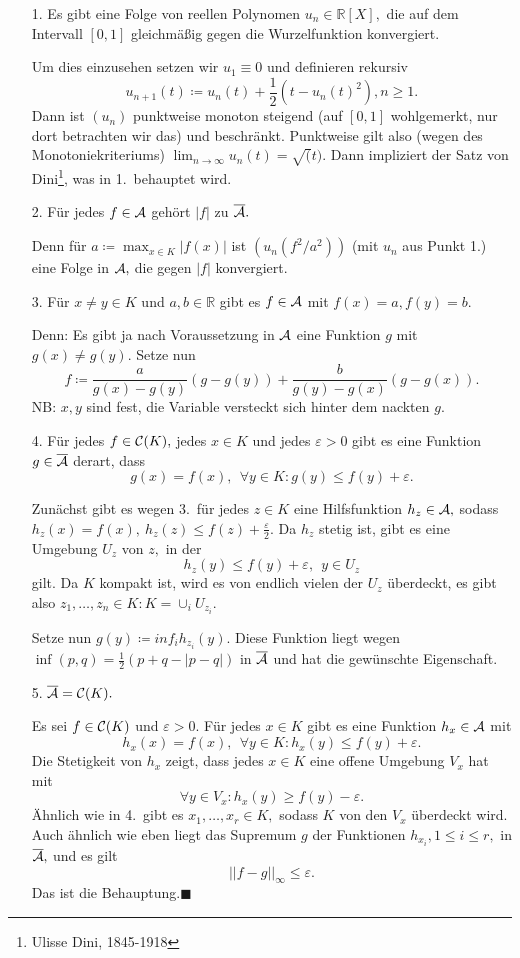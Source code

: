 \documentclass[12pt]{scrbook}   %
\newcommand{\da}{\coloneqq}
\begin{document}
\begin{itemize}
\item[1.] Es gibt eine Folge von reellen Polynomen $u_n\in \mathbb R[X],$
die auf dem Intervall $[0,1]$ gleichmäßig gegen die Wurzelfunktion 
konvergiert.

Um dies einzusehen setzen wir $u_1\equiv 0$ und definieren rekursiv
$$u_{n+1} (t) \da u_n(t) + \frac12(t-u_n(t)^2), n\geq 1.$$
Dann ist $(u_n)$ punktweise monoton steigend (auf $[0,1]$ wohlgemerkt, nur dort
betrachten wir das) und beschränkt. Punktweise gilt also (wegen des 
Monotoniekriteriums) $\lim_{n\to\infty} u_n(t) = \sqrt(t).$ Dann impliziert der 
Satz von Dini\footnote{Ulisse Dini, 1845-1918}, was in 1.\ behauptet wird.

\item[2.] Für jedes $f\in {\cal A}$ gehört $|f|$ zu $\overline{\cal A}.$

Denn für $a\da \max_{x\in K}|f(x)|$ ist $(u_n(f^2/a^2))$ (mit $u_n$ aus Punkt 
1.) eine Folge in $\cal A,$ die gegen $|f|$ konvergiert.

\item[3.] Für $x\neq y\in K$ und $a,b\in \mathbb R$ gibt es $f\in {\cal A}$ 
mit $f(x)=a, f(y) = b.$

Denn: Es gibt ja nach Voraussetzung in ${\cal A}$ eine Funktion $g$ mit
$g(x)\neq g(y).$ Setze nun 
$$f\da \frac a{g(x)-g(y)}(g-g(y)) + \frac b{g(y)-g(x)}(g-g(x)).$$
NB: $x,y$ sind fest, die Variable versteckt sich hinter dem nackten $g.$

\item[4.] Für jedes $f\in {\cal C}(K),$ jedes $x\in K$ und jedes 
$\varepsilon >0$ gibt es eine Funktion $g\in \overline{\cal A}$ derart, dass
$$g(x) = f(x),\ \ \forall y\in K: g(y)\leq f(y)+\varepsilon.$$

Zunächst gibt es wegen 3.\ für jedes $z\in K$ eine Hilfsfunktion 
$h_z\in {\cal A},$ sodass $h_z(x) = f(x),\ h_z(z)\leq f(z)+\frac\varepsilon 2.$
Da $h_z$ stetig ist, gibt es eine Umgebung $U_z$ von $z,$ in der 
$$h_z(y) \leq f(y)+\varepsilon, \ \ y\in U_z$$
gilt. Da $K$ kompakt ist, wird es von endlich vielen der $U_z$ überdeckt, 
es gibt also $z_1,\dots , z_n\in K: K=\cup_i U_{z_i}.$

Setze nun $g(y)\da inf_i h_{z_i}(y).$ 
Diese Funktion liegt wegen 
$\inf(p,q) = \frac12(p+q-|p-q|)$ in $\overline{\cal A}$ und hat die 
gewünschte Eigenschaft.

\item[5.] $\overline{\cal A} = {\cal C}(K).$

Es sei $f\in {\cal C}(K)$ und $\varepsilon >0.$ Für jedes $x\in K$ gibt es
eine Funktion $h_x\in {\cal A}$ mit 
$$h_x(x) = f(x),\ \ \forall y\in K: h_x(y)\leq f(y)+\varepsilon.$$
Die Stetigkeit von $h_x$ zeigt, dass jedes $x\in K$ eine offene Umgebung 
$V_x$ hat mit
$$\forall y\in V_x: h_x(y)\geq f(y)-\varepsilon.$$
Ähnlich wie in 4.\ gibt es $x_1,\dots ,x_r\in K,$ sodass $K$ von den 
$V_x$ überdeckt wird. Auch ähnlich wie eben liegt das Supremum $g$ der 
Funktionen $h_{x_i},1\leq i\leq r,$ in $\overline{\cal A},$ und es gilt
$$||f-g||_\infty \leq\varepsilon.$$
Das ist die Behauptung.\phantom{.}\hfill{$\blacksquare$}

\end{itemize}
\end{document}

